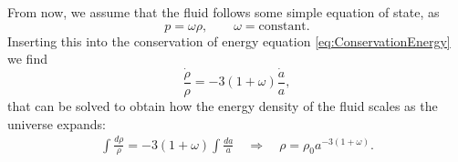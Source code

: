 From now, we assume that the fluid follows some simple equation of state, as
\begin{equation}\label{eq:EquationState}
    p=\omega\rho,\qquad\omega=\text{constant}.
\end{equation}
Inserting this into the conservation of energy equation \eqref{eq:ConservationEnergy} we find
\begin{equation*}
    \frac{\dot\rho}{\rho}=-3(1+\omega)\frac{\dot a }{a},
\end{equation*}
that can be solved to obtain how the energy density of the fluid scales as the universe expands:
\begin{align*}
    \int \frac{d\rho}{\rho}=-3(1+\omega)\int \frac{da}{a} \quad\Rightarrow\quad \boxed{\rho=\rho_0a^{-3(1+\omega)}}.
\end{align*}

